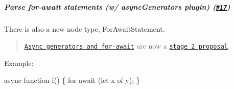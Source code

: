 \subparagraph*{Parse for-\/await statements (w/ {\ttfamily async\+Generators} plugin) (\href{https://github.com/babel/babylon/pull/17}{\tt \#17})}

There is also a new node type, {\ttfamily For\+Await\+Statement}.

\begin{quote}
\href{https://github.com/tc39/proposal-async-iteration}{\tt Async generators and for-\/await} are now a \href{https://github.com/tc39/ecma262#current-proposals}{\tt stage 2 proposal}. \end{quote}


Example\+:


\begin{DoxyCode}
async function f() \{
  for await (let x of y);
\}
\end{DoxyCode}
 